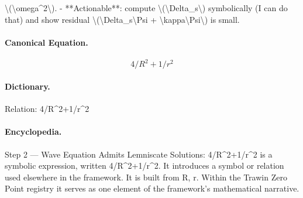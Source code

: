\textbackslash{}(\textbackslash{}omega\textasciicircum{}2\textbackslash{}). - **Actionable**: compute \textbackslash{}(\textbackslash{}Delta\_s\textbackslash{}) symbolically (I can do that) and show residual \textbackslash{}(\textbackslash{}Delta\_s\textbackslash{}Psi + \textbackslash{}kappa\textbackslash{}Psi\textbackslash{}) is small.

\paragraph{Canonical Equation.}
\[
4/R^2+1/r^2
\]

\paragraph{Dictionary.}
Relation: 4/R\textasciicircum{}2+1/r\textasciicircum{}2

\paragraph{Encyclopedia.}
Step 2 — Wave Equation Admits Lemniscate Solutions: 4/R\textasciicircum{}2+1/r\textasciicircum{}2 is a symbolic expression, written 4/R\textasciicircum{}2+1/r\textasciicircum{}2. It introduces a symbol or relation used elsewhere in the framework. It is built from R, r. Within the Trawin Zero Point registry it serves as one element of the framework's mathematical narrative.
